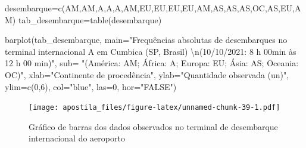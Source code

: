 \documentclass[
]{book}
\newenvironment{Shaded}{\begin{snugshade}}{\end{snugshade}}
\newcommand{\AttributeTok}[1]{\textcolor[rgb]{0.77,0.63,0.00}{#1}}
\newcommand{\DecValTok}[1]{\textcolor[rgb]{0.00,0.00,0.81}{#1}}
\newcommand{\FunctionTok}[1]{\textcolor[rgb]{0.00,0.00,0.00}{#1}}
\newcommand{\NormalTok}[1]{#1}
\newcommand{\OtherTok}[1]{\textcolor[rgb]{0.56,0.35,0.01}{#1}}
\newcommand{\SpecialCharTok}[1]{\textcolor[rgb]{0.00,0.00,0.00}{#1}}
\newcommand{\StringTok}[1]{\textcolor[rgb]{0.31,0.60,0.02}{#1}}
\begin{document}
\begin{Shaded}
\begin{Highlighting}[]
\NormalTok{desembarque}\OtherTok{=}\FunctionTok{c}\NormalTok{(}\StringTok{\textquotesingle{}AM\textquotesingle{}}\NormalTok{,}\StringTok{\textquotesingle{}AM\textquotesingle{}}\NormalTok{,}\StringTok{\textquotesingle{}A\textquotesingle{}}\NormalTok{,}\StringTok{\textquotesingle{}A\textquotesingle{}}\NormalTok{,}\StringTok{\textquotesingle{}A\textquotesingle{}}\NormalTok{,}\StringTok{\textquotesingle{}AM\textquotesingle{}}\NormalTok{,}\StringTok{\textquotesingle{}EU\textquotesingle{}}\NormalTok{,}\StringTok{\textquotesingle{}EU\textquotesingle{}}\NormalTok{,}\StringTok{\textquotesingle{}EU\textquotesingle{}}\NormalTok{,}\StringTok{\textquotesingle{}EU\textquotesingle{}}\NormalTok{,}\StringTok{\textquotesingle{}AM\textquotesingle{}}\NormalTok{,}\StringTok{\textquotesingle{}AS\textquotesingle{}}\NormalTok{,}\StringTok{\textquotesingle{}AS\textquotesingle{}}\NormalTok{,}\StringTok{\textquotesingle{}AS\textquotesingle{}}\NormalTok{,}\StringTok{\textquotesingle{}OC\textquotesingle{}}\NormalTok{,}\StringTok{\textquotesingle{}AS\textquotesingle{}}\NormalTok{,}\StringTok{\textquotesingle{}EU\textquotesingle{}}\NormalTok{,}\StringTok{\textquotesingle{}AM\textquotesingle{}}\NormalTok{)}
\NormalTok{tab\_desembarque}\OtherTok{=}\FunctionTok{table}\NormalTok{(desembarque)}

\FunctionTok{barplot}\NormalTok{(tab\_desembarque,}
        \AttributeTok{main=}\StringTok{"Frequências absolutas de desembarques no terminal internacional A em Cumbica (SP, Brasil) }\SpecialCharTok{\textbackslash{}n}\StringTok{(10/10/2021: 8 h 00min às 12 h 00 min)"}\NormalTok{,}
        \AttributeTok{sub=} \StringTok{"(América: AM; África: A; Europa: EU; Ásia: AS; Oceania: OC)"}\NormalTok{,}
        \AttributeTok{xlab=}\StringTok{"Continente de procedência"}\NormalTok{,}
        \AttributeTok{ylab=}\StringTok{"Quantidade observada (un)"}\NormalTok{,}
        \AttributeTok{ylim=}\FunctionTok{c}\NormalTok{(}\DecValTok{0}\NormalTok{,}\DecValTok{6}\NormalTok{),}
        \AttributeTok{col=}\StringTok{"blue"}\NormalTok{,}
        \AttributeTok{las=}\DecValTok{0}\NormalTok{, }
        \AttributeTok{hor=}\StringTok{"FALSE"}\NormalTok{)}
\end{Highlighting}
\end{Shaded}

\begin{figure}
\centering
\texttt{[image: apostila\_files/figure-latex/unnamed-chunk-39-1.pdf]}
\caption{\label{fig:unnamed-chunk-39}Gráfico de barras dos dados observados no terminal de desembarque internacional do aeroporto}
\end{figure}
\end{document}

